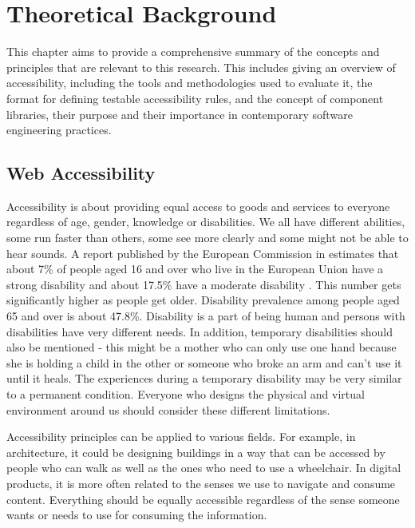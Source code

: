 \documentclass{master_thesis}
\begin{document}
\section{Theoretical Background}\label{chap:background}

This chapter aims to provide a comprehensive summary of the concepts and principles that are relevant to this research. This includes giving an overview of accessibility, including the tools and methodologies used to evaluate it, the format for defining testable accessibility rules, and the concept of component libraries, their purpose and their importance in contemporary software engineering practices.

\subsection{Web Accessibility}

Accessibility is about providing equal access to goods and services to everyone regardless of age, gender, knowledge or disabilities. We all have different abilities, some run faster than others, some see more clearly and some might not be able to hear sounds. A report published by the European Commission in \citeyear{Grammenos2020} estimates that about 7\% of people aged 16 and over who live in the European Union have a strong disability and about 17.5\% have a moderate disability \citep{Grammenos2020}. This number gets significantly higher as people get older. Disability prevalence among people aged 65 and over is about 47.8\%.  Disability is a part of being human and persons with disabilities have very different needs. In addition, temporary disabilities should also be mentioned - this might be a mother who can only use one hand because she is holding a child in the other or someone who broke an arm and can't use it until it heals. The experiences during a temporary disability may be very similar to a permanent condition. Everyone who designs the physical and virtual environment around us should consider these different limitations.

Accessibility principles can be applied to various fields. For example, in architecture, it could be designing buildings in a way that can be accessed by people who can walk as well as the ones who need to use a wheelchair. In digital products, it is more often related to the senses we use to navigate and consume content. Everything should be equally accessible regardless of the sense someone wants or needs to use for consuming the information.
\end{document}
